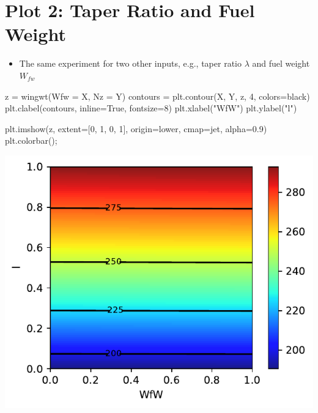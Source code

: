 \documentclass[
  letterpaper,
  DIV=11,
  numbers=noendperiod]{scrreprt}
\newenvironment{Shaded}{\begin{snugshade}}{\end{snugshade}}
\newcommand{\DecValTok}[1]{\textcolor[rgb]{0.68,0.00,0.00}{#1}}
\newcommand{\FloatTok}[1]{\textcolor[rgb]{0.68,0.00,0.00}{#1}}
\newcommand{\NormalTok}[1]{\textcolor[rgb]{0.00,0.23,0.31}{#1}}
\newcommand{\OperatorTok}[1]{\textcolor[rgb]{0.37,0.37,0.37}{#1}}
\newcommand{\StringTok}[1]{\textcolor[rgb]{0.13,0.47,0.30}{#1}}
\newcommand{\VariableTok}[1]{\textcolor[rgb]{0.07,0.07,0.07}{#1}}
\providecommand{\tightlist}{%
  \setlength{\itemsep}{0pt}\setlength{\parskip}{0pt}}\usepackage{longtable,booktabs,array}
\begin{document}
\section{Plot 2: Taper Ratio and Fuel
Weight}\label{plot-2-taper-ratio-and-fuel-weight}

\begin{itemize}
\tightlist
\item
  The same experiment for two other inputs, e.g., taper ratio
  \(\lambda\) and fuel weight \(W_{fw}\)
\end{itemize}

\begin{Shaded}
\begin{Highlighting}[]
\NormalTok{z }\OperatorTok{=}\NormalTok{ wingwt(Wfw }\OperatorTok{=}\NormalTok{ X,  Nz }\OperatorTok{=}\NormalTok{ Y)}
\NormalTok{contours }\OperatorTok{=}\NormalTok{ plt.contour(X, Y, z, }\DecValTok{4}\NormalTok{, colors}\OperatorTok{=}\StringTok{\textquotesingle{}black\textquotesingle{}}\NormalTok{)}
\NormalTok{plt.clabel(contours, inline}\OperatorTok{=}\VariableTok{True}\NormalTok{, fontsize}\OperatorTok{=}\DecValTok{8}\NormalTok{)}
\NormalTok{plt.xlabel(}\StringTok{"WfW"}\NormalTok{)}
\NormalTok{plt.ylabel(}\StringTok{"l"}\NormalTok{)}

\NormalTok{plt.imshow(z, extent}\OperatorTok{=}\NormalTok{[}\DecValTok{0}\NormalTok{, }\DecValTok{1}\NormalTok{, }\DecValTok{0}\NormalTok{, }\DecValTok{1}\NormalTok{], origin}\OperatorTok{=}\StringTok{\textquotesingle{}lower\textquotesingle{}}\NormalTok{,}
\NormalTok{           cmap}\OperatorTok{=}\StringTok{\textquotesingle{}jet\textquotesingle{}}\NormalTok{, alpha}\OperatorTok{=}\FloatTok{0.9}\NormalTok{)}
\NormalTok{plt.colorbar()}\OperatorTok{;}
\end{Highlighting}
\end{Shaded}

\includegraphics{002_awwe_files/figure-pdf/cell-7-output-1.pdf}
\end{document}
